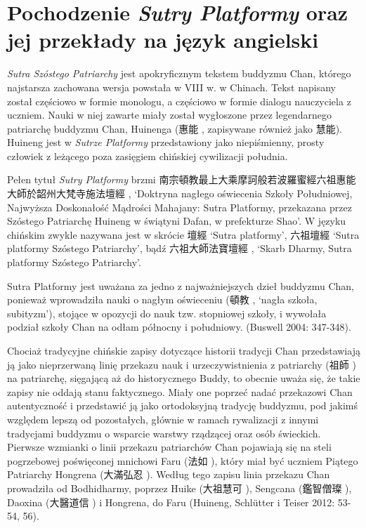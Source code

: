 \section{Pochodzenie \textit{Sutry Platformy} oraz jej przekłady na język angielski}
\textit{Sutra Szóstego Patriarchy} jest apokryficznym tekstem buddyzmu Chan, którego najstarsza zachowana wersja powstała w VIII w. w Chinach. Tekst napisany został częściowo w formie monologu, a częściowo w formie dialogu nauczyciela z uczniem. Nauki w niej zawarte miały został wygłoszone przez legendarnego patriarchę buddyzmu Chan, Huinenga (惠能 , zapisywane również jako 慧能). %
Huineng jest w \textit{Sutrze Platformy} przedstawiony jako niepiśmienny, prosty człowiek z leżącego poza zasięgiem chińskiej cywilizacji południa.

Pełen tytuł \textit{Sutry Platformy} brzmi 南宗頓教最上大乘摩訶般若波羅蜜經六祖惠能大師於韶州大梵寺施法壇經 , `Doktryna nagłego oświecenia Szkoły Południowej, Najwyższa Doskonałość Mądrości Mahajany: Sutra Platformy, przekazana przez Szóstego Patriarchę Huineng w świątyni Dafan, w prefekturze Shao'. W języku chińskim zwykle nazywana jest w skrócie 壇經  `Sutra platformy', 六祖壇經  `Sutra platformy Szóstego Patriarchy', bądź 六祖大師法寶壇經 , `Skarb Dharmy, Sutra platformy Szóstego Patriarchy'.

Sutra Platformy jest uważana za jedno z najważniejszych dzieł buddyzmu Chan, ponieważ wprowadziła nauki o nagłym oświeceniu (頓教 , `nagła szkoła, subityzm'), stojące w opozycji do nauk tzw. stopniowej szkoły, i wywołała podział szkoły Chan na odłam północny i południowy. %
(Buswell 2004: 347-348).%

Chociaż tradycyjne chińskie zapisy dotyczące historii tradycji Chan przedstawiają ją jako nieprzerwaną linię przekazu nauk i urzeczywistnienia z patriarchy (祖師 ) na patriarchę, sięgającą aż do historycznego Buddy, to obecnie uważa się, że takie zapisy nie oddają stanu faktycznego. Miały one poprzeć nadać przekazowi Chan autentyczność i przedstawić ją jako ortodoksyjną tradycję buddyzmu, pod jakimś względem lepszą od pozostałych, głównie w ramach rywalizacji z innymi tradycjami buddyzmu o wsparcie warstwy rządzącej oraz osób świeckich. Pierwsze wzmianki o linii przekazu patriarchów Chan pojawiają się na steli pogrzebowej poświęconej mnichowi Faru (法如 ), który miał być uczniem Piątego Patriarchy Hongrena (大滿弘忍 ). Według tego zapisu linia przekazu Chan prowadziła od Bodhidharmy, poprzez Huike (大祖慧可 ), Sengcana (鑑智僧璨 ), Daoxina (大醫道信 ) i Hongrena, do Faru (Huineng, Schlütter i Teiser 2012: 53-54, 56).

